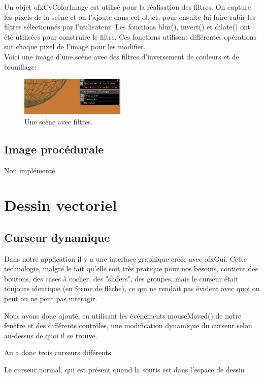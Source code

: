 Un objet ofxCvColorImage est utilisé pour la réalisation des filtres. On capture les pixels de la scène et on l’ajoute dans cet objet, pour ensuite lui faire subir les filtres sélectionnés par l’utilisateur. Les fonctions blur(), invert() et dilate() ont été utilisées pour construire le filtre. Ces fonctions utilisent différentes opérations sur chaque pixel de l’image pour les modifier.\\

Voici une image d’une scène avec des filtres d’inversement de couleurs et de brouillage:\\
\begin{figure}[h]
	\centering
	\includegraphics[width=5cm]{fig/filters.png}
	\caption{Une scène avec filtres.}
	\label{fig:filtres}
\end{figure}


\subsection{Image procédurale}
Non implémenté

\newpage

\section{Dessin vectoriel}

\subsection{Curseur dynamique}

Dans notre application il y a une interface graphique créée avec ofxGui. Cette technologie, malgré le fait qu'elle soit très pratique pour nos besoins, contient des boutons, des cases à cocher, des "sliders", des groupes, mais le curseur était toujours identique (en forme de flèche), ce qui ne rendait pas évident avec quoi on peut ou ne peut pas interagir.

Nous avons donc ajouté, en utilisant les événements mouseMoved() de notre fenêtre et des différents contrôles, une modification dynamique du curseur selon au-dessus de quoi il se trouve.

Au a donc trois curseurs différents.

Le curseur normal, qui est présent quand la souris est dans l'espace de dessin

